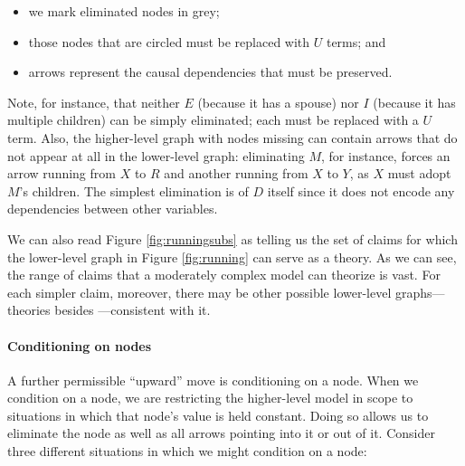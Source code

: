 \documentclass[12pt,]{book}
\providecommand{\tightlist}{%
  \setlength{\itemsep}{0pt}\setlength{\parskip}{0pt}}
\let\oldparagraph\paragraph
\renewcommand{\paragraph}[1]{\oldparagraph{#1}\mbox{}}
\begin{document}
\begin{itemize}
\tightlist
\item
  we mark eliminated nodes in grey;
\item
  those nodes that are circled must be replaced with \(U\) terms; and
\item
  arrows represent the causal dependencies that must be preserved.
\end{itemize}

Note, for instance, that neither \(E\) (because it has a spouse) nor \(I\) (because it has multiple children) can be simply eliminated; each must be replaced with a \(U\) term. Also, the higher-level graph with nodes missing can contain arrows that do not appear at all in the lower-level graph: eliminating \(M\), for instance, forces an arrow running from \(X\) to \(R\) and another running from \(X\) to \(Y\), as \(X\) must adopt \(M\)'s children. The simplest elimination is of \(D\) itself since it does not encode any dependencies between other variables.

We can also read Figure \ref{fig:runningsubs} as telling us the set of claims for which the lower-level graph in Figure \ref{fig:running} can serve as a theory. As we can see, the range of claims that a moderately complex model can theorize is vast. For each simpler claim, moreover, there may be other possible lower-level graphs---theories besides ---consistent with it.

\hypertarget{conditioning-on-nodes}{%
\paragraph{Conditioning on nodes}\label{conditioning-on-nodes}}

A further permissible ``upward'' move is conditioning on a node. When we condition on a node, we are restricting the higher-level model in scope to situations in which that node's value is held constant. Doing so allows us to eliminate the node as well as all arrows pointing into it or out of it. Consider three different situations in which we might condition on a node:
\end{document}
